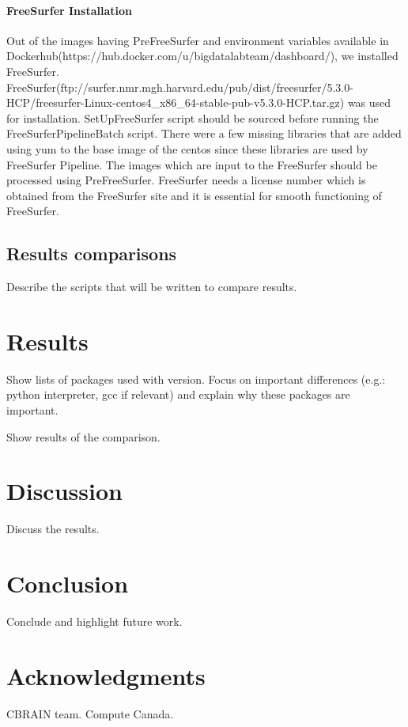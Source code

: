 \documentclass{article}
\begin{document}
\paragraph{FreeSurfer Installation}
Out of the images having PreFreeSurfer and environment variables available in Dockerhub(https://hub.docker.com/u/bigdatalabteam/dashboard/), we installed FreeSurfer. FreeSurfer(ftp://surfer.nmr.mgh.harvard.edu/pub/dist/freesurfer/5.3.0-HCP/freesurfer-Linux-centos4\_x86\_64-stable-pub-v5.3.0-HCP.tar.gz) was used for installation. SetUpFreeSurfer script should be sourced before running the FreeSurferPipelineBatch script. There were a few missing libraries that are added using yum to the base image of the centos since these libraries are used by FreeSurfer Pipeline. The images which are input to the FreeSurfer should be processed using PreFreeSurfer. FreeSurfer needs a license number which is obtained from the FreeSurfer site and it is essential for smooth functioning of FreeSurfer. 

\subsection{Results comparisons}

Describe the scripts that will be written to compare results.

\section{Results}

Show lists of packages used with version. Focus on important
differences (e.g.: python interpreter, gcc if relevant) and explain
why these packages are important.

Show results of the comparison.

\section{Discussion}

Discuss the results.

\section{Conclusion}

Conclude and highlight future work.

\section{Acknowledgments}

CBRAIN team. Compute Canada.



\end{document}
